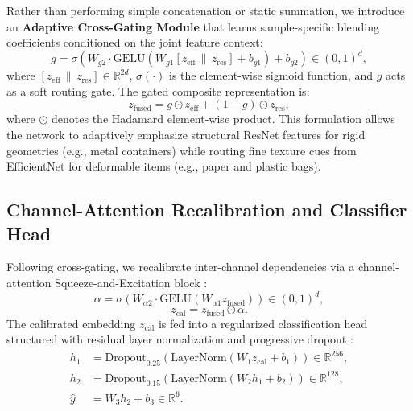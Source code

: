 \documentclass[11pt,a4paper]{article}
\begin{document}
Rather than performing simple concatenation or static summation, we introduce an \textbf{Adaptive Cross-Gating Module} that learns sample-specific blending coefficients conditioned on the joint feature context:
\begin{equation}
  g = \sigma\left(W_{g2} \cdot \mathrm{GELU}\left(W_{g1} [z_{\text{eff}} \,\|\, z_{\text{res}}] + b_{g1}\right) + b_{g2}\right) \in (0, 1)^d,
\end{equation}
where $[z_{\text{eff}} \,\|\, z_{\text{res}}] \in \mathbb{R}^{2d}$, $\sigma(\cdot)$ is the element-wise sigmoid function, and $g$ acts as a soft routing gate. The gated composite representation is:
\begin{equation}
  z_{\text{fused}} = g \odot z_{\text{eff}} + (1 - g) \odot z_{\text{res}},
\end{equation}
where $\odot$ denotes the Hadamard element-wise product. This formulation allows the network to adaptively emphasize structural ResNet features for rigid geometries (e.g., metal containers) while routing fine texture cues from EfficientNet for deformable items (e.g., paper and plastic bags).

\subsection{Channel-Attention Recalibration and Classifier Head}
Following cross-gating, we recalibrate inter-channel dependencies via a channel-attention Squeeze-and-Excitation block \cite{hu2018, woo2018}:
\begin{equation}
  \alpha = \sigma\left(W_{\alpha 2} \cdot \mathrm{GELU}\left(W_{\alpha 1} z_{\text{fused}}\right)\right) \in (0, 1)^d,
\end{equation}
\begin{equation}
  z_{\text{cal}} = z_{\text{fused}} \odot \alpha.
\end{equation}
The calibrated embedding $z_{\text{cal}}$ is fed into a regularized classification head structured with residual layer normalization and progressive dropout \cite{srivastava2014}:
\begin{align}
  h_1 &= \mathrm{Dropout}_{0.25}\left(\mathrm{LayerNorm}\left(W_1 z_{\text{cal}} + b_1\right)\right) \in \mathbb{R}^{256}, \\
  h_2 &= \mathrm{Dropout}_{0.15}\left(\mathrm{LayerNorm}\left(W_2 h_1 + b_2\right)\right) \in \mathbb{R}^{128}, \\
  \hat{y} &= W_3 h_2 + b_3 \in \mathbb{R}^6.
\end{align}
\end{document}
